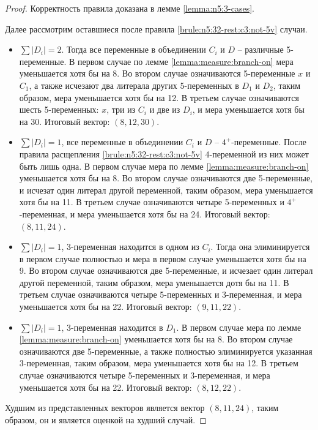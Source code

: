 \begin{proof}
 Корректность правила доказана в лемме \ref{lemma:n5:3-cases}.
 
 Далее рассмотрим оставшиеся после правила \ref{brule:n5:32-rest:c3:not-5v} случаи.

 \begin{itemize}
  \item $\sum |D_i| = 2$. Тогда все переменные в объединении $C_i$ и $D$ -- различные 5-переменные. В первом случае по лемме \ref{lemma:measure:branch-on} мера уменьшается хотя бы на 8. Во втором случае означиваются 5-переменные $x$ и $C_1$, а также исчезают два литерала других 5-переменных в $D_1$ и $D_2$, таким образом, мера уменьшается хотя бы на 12. В третьем случае означиваются шесть 5-переменных: $x$, три из $C_i$ и две из $D_i$, и мера уменьшается хотя бы на 30. Итоговый вектор: $(8,12,30)$.

  \item $\sum |D_i| = 1$, все переменные в объединении $C_i$ и $D$ -- $4^+$-переменные. После правила расщепления \ref{brule:n5:32-rest:c3:not-5v} 4-переменной из них может быть лишь одна. В первом случае мера по лемме \ref{lemma:measure:branch-on} уменьшается хотя бы на 8. Во втором случае означиваются две 5-переменные, и исчезат один литерал другой переменной, таким образом, мера уменьшается хотя бы на 11. В третьем случае означиваются четыре 5-переменных и $4^+$-переменная, и мера уменьшается хотя бы на 24. Итоговый вектор: $(8,11,24)$.

  \item $\sum |D_i| = 1$, 3-переменная находится в одном из $C_i$. Тогда она элиминируется в первом случае полностью и мера в первом случае уменьшается хотя бы на 9. Во втором случае означиваются две 5-переменные, и исчезает один литерал другой переменной, таким образом, мера уменьшается дотя бы на 11. В третьем случае означиваются четыре 5-переменных и 3-переменная, и мера уменьшается хотя бы на 22. Итоговый вектор: $(9,11,22)$.

  \item $\sum |D_i| = 1$, 3-переменная находится в $D_1$. В первом случае мера по лемме \ref{lemma:measure:branch-on} уменьшается хотя бы на 8. Во втором случае означиваются две 5-переменные, а также полностью элиминируется указанная 3-переменная, таким образом, мера уменьшается хотя бы на 12. В третьем случае означиваются четыре 5-переменных и 3-переменная, и мера уменьшается хотя бы на 22. Итоговый вектор: $(8,12,22)$.
 \end{itemize}

 Худшим из представленных векторов является вектор $(8,11,24)$, таким образом, он и является оценкой на худший случай.
\end{proof}

